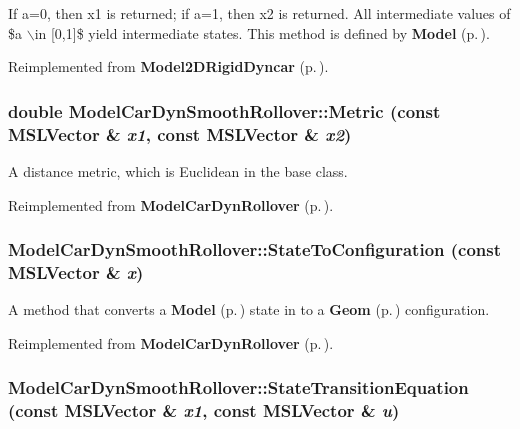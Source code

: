 If a=0, then x1 is returned; if a=1, then x2 is returned. All intermediate values of \$a $\backslash$in [0,1]\$ yield intermediate states. This method is defined by {\bf Model} {\rm (p.\,\pageref{classModel})}. 

Reimplemented from {\bf Model2DRigid\-Dyncar} {\rm (p.\,\pageref{classModel2DRigidDyncar_a6})}.
\subsubsection{\setlength{\rightskip}{0pt plus 5cm}double Model\-Car\-Dyn\-Smooth\-Rollover::Metric (const {\bf MSLVector} \& {\em x1}, const {\bf MSLVector} \& {\em x2})\hspace{0.3cm}{\tt  [virtual]}}\label{classModelCarDynSmoothRollover_a4}


A distance metric, which is Euclidean in the base class.



Reimplemented from {\bf Model\-Car\-Dyn\-Rollover} {\rm (p.\,\pageref{classModelCarDynRollover_a6})}.
\subsubsection{ Model\-Car\-Dyn\-Smooth\-Rollover::State\-To\-Configuration (const {\bf MSLVector} \& {\em x})\hspace{0.3cm}{\tt  [virtual]}}\label{classModelCarDynSmoothRollover_a3}


A method that converts a {\bf Model} {\rm (p.\,\pageref{classModel})} state in to a {\bf Geom} {\rm (p.\,\pageref{classGeom})} configuration.



Reimplemented from {\bf Model\-Car\-Dyn\-Rollover} {\rm (p.\,\pageref{classModelCarDynRollover_a4})}.
\subsubsection{ Model\-Car\-Dyn\-Smooth\-Rollover::State\-Transition\-Equation (const {\bf MSLVector} \& {\em x1}, const {\bf MSLVector} \& {\em u})\hspace{0.3cm}{\tt  [virtual]}}\label{classModelCarDynSmoothRollover_a2}


